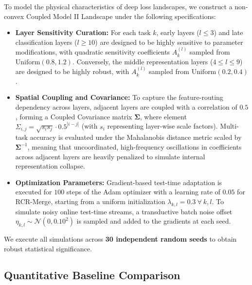 To model the physical characteristics of deep loss landscapes, we construct a non-convex Coupled Model II Landscape under the following specifications:
\begin{itemize}
    \item \textbf{Layer Sensitivity Curation:} For each task $k$, early layers ($l \le 3$) and late classification layers ($l \ge 10$) are designed to be highly sensitive to parameter modifications, with quadratic sensitivity coefficients $A_k^{(l)}$ sampled from $\text{Uniform}(0.8, 1.2)$. Conversely, the middle representation layers ($4 \le l \le 9$) are designed to be highly robust, with $A_k^{(l)}$ sampled from $\text{Uniform}(0.2, 0.4)$.
    \item \textbf{Spatial Coupling and Covariance:} To capture the feature-routing dependency across layers, adjacent layers are coupled with a correlation of $0.5$, forming a Coupled Covariance matrix $\boldsymbol{\Sigma}$, where element $\Sigma_{i, j} = \sqrt{s_i s_j} \cdot 0.5^{|i-j|}$ (with $s_i$ representing layer-wise scale factors). Multi-task accuracy is evaluated under the Mahalanobis distance metric scaled by $\boldsymbol{\Sigma}^{-1}$, meaning that uncoordinated, high-frequency oscillations in coefficients across adjacent layers are heavily penalized to simulate internal representation collapse.
    \item \textbf{Optimization Parameters:} Gradient-based test-time adaptation is executed for $100$ steps of the Adam optimizer with a learning rate of $0.05$ for RCR-Merge, starting from a uniform initialization $\lambda_{k, l} = 0.3 \ \forall \ k, l$. To simulate noisy online test-time streams, a transductive batch noise offset $\eta_{k, l} \sim \mathcal{N}(0, 0.10^2)$ is sampled and added to the gradients at each seed.
\end{itemize}
We execute all simulations across \textbf{30 independent random seeds} to obtain robust statistical significance.

\subsection{Quantitative Baseline Comparison}


